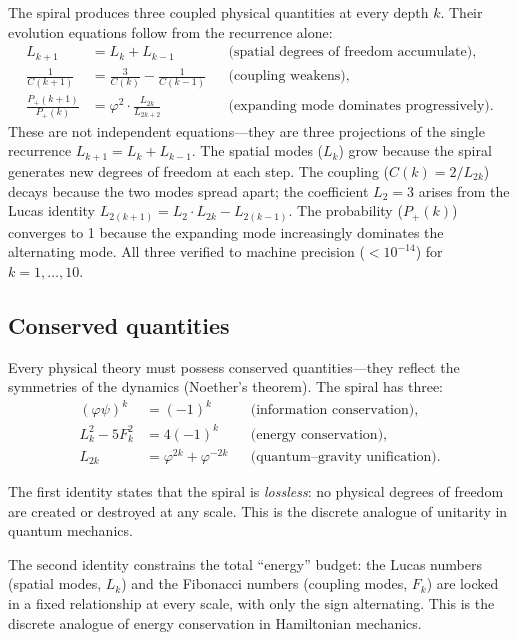 \documentclass[12pt,a4paper]{article}
\begin{document}
The spiral produces three coupled physical quantities at every depth $k$. Their evolution equations follow from the recurrence alone:
\begin{align}
L_{k+1} &= L_k + L_{k-1} &&\text{(spatial degrees of freedom accumulate)}, \label{eq:L-evol}\\
\frac{1}{C(k+1)} &= \frac{3}{C(k)} - \frac{1}{C(k-1)} &&\text{(coupling weakens)}, \label{eq:C-evol}\\
\frac{P_+(k+1)}{P_+(k)} &= \varphi^2 \cdot \frac{L_{2k}}{L_{2k+2}} &&\text{(expanding mode dominates progressively)}. \label{eq:P-evol}
\end{align}
These are not independent equations---they are three projections of the single recurrence $L_{k+1} = L_k + L_{k-1}$. The spatial modes ($L_k$) grow because the spiral generates new degrees of freedom at each step. The coupling ($C(k) = 2/L_{2k}$) decays because the two modes spread apart; the coefficient $L_2 = 3$ arises from the Lucas identity $L_{2(k+1)} = L_2 \cdot L_{2k} - L_{2(k-1)}$. The probability ($P_+(k)$) converges to 1 because the expanding mode increasingly dominates the alternating mode. All three verified to machine precision ($< 10^{-14}$) for $k = 1, \ldots, 10$.

\subsection{Conserved quantities}

Every physical theory must possess conserved quantities---they reflect the symmetries of the dynamics (Noether's theorem). The spiral has three:
\begin{align}
(\varphi\psi)^k &= (-1)^k &&\text{(information conservation)}, \label{eq:det-conserv}\\
L_k^2 - 5F_k^2 &= 4(-1)^k &&\text{(energy conservation)}, \label{eq:energy-conserv}\\
L_{2k} &= \varphi^{2k} + \varphi^{-2k} &&\text{(quantum--gravity unification)}. \label{eq:unify-conserv}
\end{align}

The first identity states that the spiral is \emph{lossless}: no physical degrees of freedom are created or destroyed at any scale. This is the discrete analogue of unitarity in quantum mechanics.

The second identity constrains the total ``energy'' budget: the Lucas numbers (spatial modes, $L_k$) and the Fibonacci numbers (coupling modes, $F_k$) are locked in a fixed relationship at every scale, with only the sign alternating. This is the discrete analogue of energy conservation in Hamiltonian mechanics.
\end{document}
